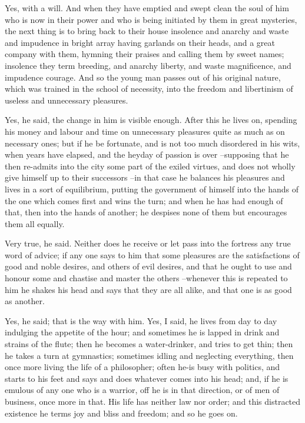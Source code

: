 Yes, with a will.
And when they have emptied and swept clean the soul of him who is now in their power and who is being initiated by them in great mysteries, the next thing is to bring back to their house insolence and anarchy and waste and impudence in bright array having garlands on their heads, and a great company with them, hymning their praises and calling them by sweet names; insolence they term breeding, and anarchy liberty, and waste magnificence, and impudence courage. And so the young man passes out of his original nature, which was trained in the school of necessity, into the freedom and libertinism of useless and unnecessary pleasures.

Yes, he said, the change in him is visible enough.
After this he lives on, spending his money and labour and time on unnecessary pleasures quite as much as on necessary ones; but if he be fortunate, and is not too much disordered in his wits, when years have elapsed, and the heyday of passion is over --supposing that he then re-admits into the city some part of the exiled virtues, and does not wholly give himself up to their successors --in that case he balances his pleasures and lives in a sort of equilibrium, putting the government of himself into the hands of the one which comes first and wins the turn; and when he has had enough of that, then into the hands of another; he despises none of them but encourages them all equally.

Very true, he said.
Neither does he receive or let pass into the fortress any true word of advice; if any one says to him that some pleasures are the satisfactions of good and noble desires, and others of evil desires, and that he ought to use and honour some and chastise and master the others --whenever this is repeated to him he shakes his head and says that they are all alike, and that one is as good as another.

Yes, he said; that is the way with him.
Yes, I said, he lives from day to day indulging the appetite of the hour; and sometimes he is lapped in drink and strains of the flute; then he becomes a water-drinker, and tries to get thin; then he takes a turn at gymnastics; sometimes idling and neglecting everything, then once more living the life of a philosopher; often he-is busy with politics, and starts to his feet and says and does whatever comes into his head; and, if he is emulous of any one who is a warrior, off he is in that direction, or of men of business, once more in that. His life has neither law nor order; and this distracted existence he terms joy and bliss and freedom; and so he goes on.

